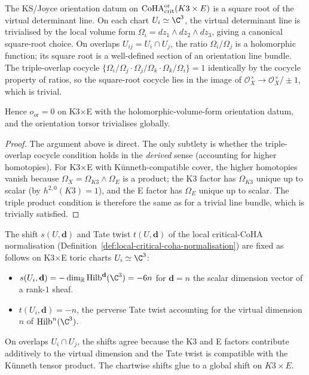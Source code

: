 \begin{proposition}
\label{prop:r6-orientation-torsor-k3e}
The KS/Joyce orientation datum on $\mathrm{CoHA}_{\mathrm{crit}}^{\mathrm{or}}(K3\times E)$
is a square root of the virtual determinant line. On each chart
$U_i\simeq\C^3$, the virtual determinant line is trivialised by the
local volume form $\Omega_i = dz_1\wedge dz_2\wedge dz_3$, giving a
canonical square-root choice. On overlaps $U_{ij} = U_i\cap U_j$, the
ratio $\Omega_i/\Omega_j$ is a holomorphic function; its square root
is a well-defined section of an orientation line bundle. The
triple-overlap cocycle $\{\Omega_i/\Omega_j \cdot \Omega_j/\Omega_k
\cdot \Omega_k/\Omega_i\} = 1$ identically by the cocycle property of
ratios, so the square-root cocycle lies in the image of $\mathcal O_X^\times
\to \mathcal O_X^\times/\pm 1$, which is trivial.

Hence $o_{\mathrm{or}} = 0$ on K3$\times$E with the
holomorphic-volume-form orientation datum, and the orientation torsor
trivialises globally.
\end{proposition}

\begin{proof}
The argument above is direct. The only subtlety is whether the
triple-overlap cocycle condition holds in the \emph{derived} sense
(accounting for higher homotopies). For K3$\times$E with
Künneth-compatible cover, the higher homotopies vanish because
$\Omega_X = \Omega_{K3}\wedge\Omega_E$ is a product; the K3 factor
has $\Omega_{K3}$ unique up to scalar (by $h^{2,0}(K3) = 1$), and
the E factor has $\Omega_E$ unique up to scalar. The triple product
condition is therefore the same as for a trivial line bundle, which
is trivially satisfied.
\end{proof}

\begin{proposition}
\label{prop:r6-grading-discipline-k3e}
The shift $s(U,\mathbf d)$ and Tate twist $t(U,\mathbf d)$ of the
local critical-CoHA normalisation
(Definition~\ref{def:local-critical-coha-normalisation}) are fixed as
follows on K3$\times$E toric charts $U_i\simeq\C^3$:
\begin{itemize}
\item $s(U_i,\mathbf d) = -\dim_{\mathbb R} \Hilb^{\mathbf d}(\C^3) = -6 n$
for $\mathbf d = n$ the scalar dimension vector of a rank-$1$ sheaf.
\item $t(U_i,\mathbf d) = -n$, the perverse Tate twist accounting for
the virtual dimension $n$ of $\Hilb^n(\C^3)$.
\end{itemize}
On overlaps $U_i\cap U_j$, the shifts agree because the K3 and E
factors contribute additively to the virtual dimension and the Tate
twist is compatible with the Künneth tensor product. The chartwise
shifts glue to a global shift on $K3\times E$.
\end{proposition}

